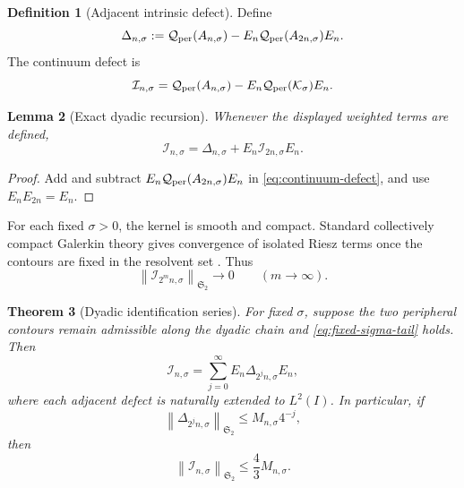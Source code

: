 \documentclass[11pt]{article}
\newtheorem{theorem}{Theorem}[section]
\newtheorem{lemma}[theorem]{Lemma}
\theoremstyle{definition}
\newtheorem{definition}[theorem]{Definition}
\theoremstyle{remark}
\newcommand{\cK}{\mathcal K}
\newcommand{\cQ}{\mathcal Q}
\newcommand{\cI}{\mathcal I}
\newcommand{\HS}{\mathfrak S_2}
\newcommand{\norm}[1]{\left\lVert #1\right\rVert}
\begin{document}
\begin{definition}[Adjacent intrinsic defect]
\label{def:adjacent-defect}
Define
\begin{equation}
 \Delta_{n,\sigma}
 :=\cQ_{\rm per}(A_{n,\sigma})
 -E_n\cQ_{\rm per}(A_{2n,\sigma})E_n.
 \label{eq:adjacent-defect}
\end{equation}
The continuum defect is
\begin{equation}
 \cI_{n,\sigma}
 =\cQ_{\rm per}(A_{n,\sigma})
 -E_n\cQ_{\rm per}(\cK_\sigma)E_n.
 \label{eq:continuum-defect}
\end{equation}
\end{definition}

\begin{lemma}[Exact dyadic recursion]
\label{lem:dyadic-recursion}
Whenever the displayed weighted terms are defined,
\begin{equation}
 \cI_{n,\sigma}
 =\Delta_{n,\sigma}+E_n\cI_{2n,\sigma}E_n.
 \label{eq:dyadic-recursion}
\end{equation}
\end{lemma}

\begin{proof}
Add and subtract
$E_n\cQ_{\rm per}(A_{2n,\sigma})E_n$ in
\eqref{eq:continuum-defect}, and use $E_nE_{2n}=E_n$.
\end{proof}

For each fixed $\sigma>0$, the kernel is smooth and compact.  Standard
collectively compact Galerkin theory gives convergence of isolated Riesz
terms once the contours are fixed in the resolvent set
\citep{Chatelin1983,Kato1995}.  Thus
\begin{equation}
 \norm{\cI_{2^mn,\sigma}}_{\HS}\longrightarrow0
 \qquad(m\to\infty).
 \label{eq:fixed-sigma-tail}
\end{equation}

\begin{theorem}[Dyadic identification series]
\label{thm:dyadic-series}
For fixed $\sigma$, suppose the two peripheral contours remain admissible
along the dyadic chain and \eqref{eq:fixed-sigma-tail} holds.  Then
\begin{equation}
 \cI_{n,\sigma}
 =\sum_{j=0}^\infty
 E_n\Delta_{2^jn,\sigma}E_n,
 \label{eq:dyadic-series}
\end{equation}
where each adjacent defect is naturally extended to $L^2(I)$.  In
particular, if
\begin{equation}
 \norm{\Delta_{2^jn,\sigma}}_{\HS}
 \le M_{n,\sigma}4^{-j},
 \label{eq:quadratic-dyadic-ledger}
\end{equation}
then
\begin{equation}
 \norm{\cI_{n,\sigma}}_{\HS}
 \le\frac43M_{n,\sigma}.
 \label{eq:four-thirds}
\end{equation}
\end{theorem}
\end{document}

